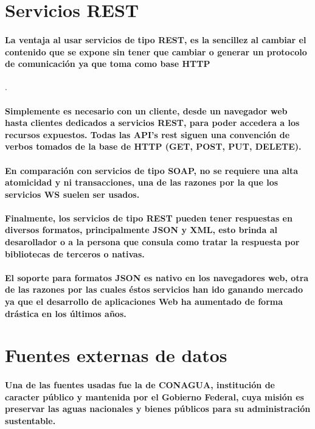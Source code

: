 \section*{Servicios REST}
\paragraph{La ventaja al usar servicios de tipo REST, es la sencillez al cambiar el contenido que se expone sin tener que cambiar o generar un protocolo de comunicación ya que toma como base HTTP}.
\paragraph{Simplemente es necesario con un cliente, desde un navegador web hasta clientes dedicados a servicios REST, para poder accedera a los recursos expuestos. Todas las API's rest siguen una convención de verbos tomados de la base de HTTP (GET, POST, PUT, DELETE).}
\paragraph{En comparación con servicios de tipo SOAP, no se requiere una alta atomicidad y ni transacciones, una de las razones por la que los servicios WS suelen ser usados.}
\paragraph{Finalmente, los servicios de tipo REST pueden tener respuestas en diversos formatos, principalmente JSON y XML, esto brinda al desarollador o a la persona que consula como tratar la respuesta por bibliotecas de terceros o nativas.}
\paragraph{El soporte para formatos JSON es nativo en los navegadores web, otra de las razones por las cuales éstos servicios han ido ganando mercado ya que el desarrollo de aplicaciones Web ha aumentado de forma drástica en los últimos años. \cite{31}}

%
%

\newpage
\section*{Fuentes externas de datos}
\paragraph{Una de las fuentes usadas fue la de \textbf{CONAGUA}, institución de caracter público y mantenida por el Gobierno Federal, cuya misión es preservar las aguas nacionales y bienes públicos para su administración sustentable.}
